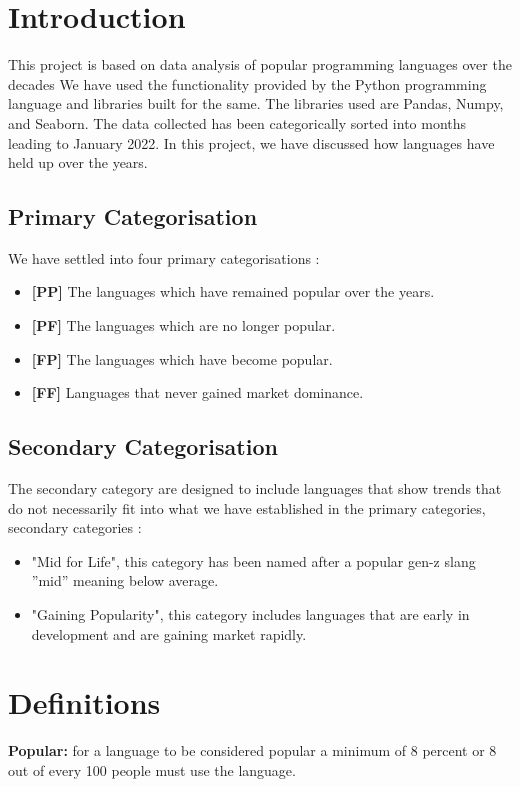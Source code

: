 \documentclass[conference]{IEEEtran}
\begin{document}
\section{Introduction}
This project is based on data analysis of popular programming languages over the decades
We have used the functionality provided by the Python programming language and libraries built for the same. The libraries used are Pandas, Numpy, and Seaborn. The data collected has been categorically sorted into months leading to January 2022. In this project, we have discussed how languages have held up over the years.

\subsection{Primary Categorisation}\label{AA}
We have settled into four primary categorisations : 

\begin{itemize}
\item \textbf{[PP]} The languages which have remained popular over the years.
\item \textbf{[PF]} The languages which are no longer popular.
\item \textbf{[FP]} The languages which have become popular.
\item \textbf{[FF]} Languages that never gained market dominance.
\end{itemize}

\subsection{Secondary Categorisation}
The secondary category are designed to include languages that show  trends that do not necessarily fit into what we have established in the primary categories, secondary categories :
\begin{itemize}
\item "Mid for Life", this category has been named after a popular gen-z slang ''mid'' meaning below average.
\item "Gaining Popularity", this category includes languages that are early in development and are gaining market rapidly.
\end{itemize}

\section{Definitions}
\textbf{Popular:} for a language to be considered popular a minimum of 8 percent or 8 out of every 100 people must use the language. 
\end{document}
